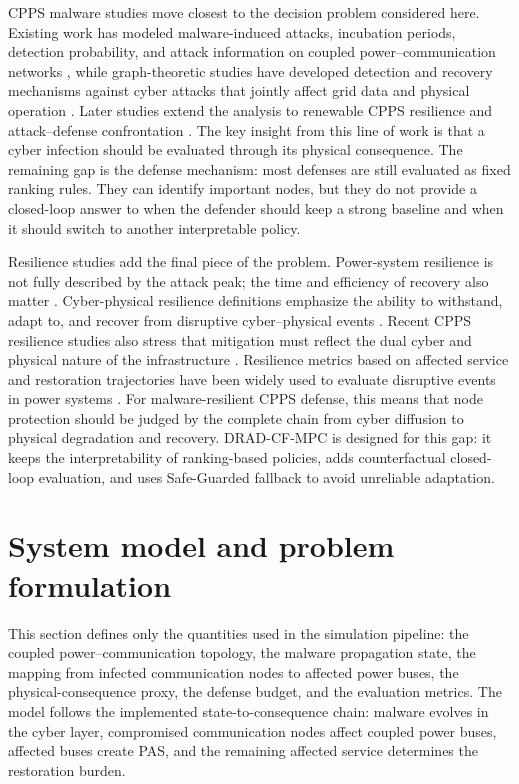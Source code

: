 \documentclass[lettersize,journal]{IEEEtran}
\begin{document}
CPPS malware studies move closest to the decision problem considered here. Existing work has modeled malware-induced attacks, incubation periods, detection probability, and attack information on coupled power--communication networks \cite{xu2020analysis}, while graph-theoretic studies have developed detection and recovery mechanisms against cyber attacks that jointly affect grid data and physical operation \cite{soltan2019react}. Later studies extend the analysis to renewable CPPS resilience and attack--defense confrontation \cite{xu2023resilience,zhang2025robustness}. The key insight from this line of work is that a cyber infection should be evaluated through its physical consequence. The remaining gap is the defense mechanism: most defenses are still evaluated as fixed ranking rules. They can identify important nodes, but they do not provide a closed-loop answer to when the defender should keep a strong baseline and when it should switch to another interpretable policy.

Resilience studies add the final piece of the problem. Power-system resilience is not fully described by the attack peak; the time and efficiency of recovery also matter \cite{mahzarnia2020review,younesi2022trends}. Cyber-physical resilience definitions emphasize the ability to withstand, adapt to, and recover from disruptive cyber--physical events \cite{arghandeh2016definition}. Recent CPPS resilience studies also stress that mitigation must reflect the dual cyber and physical nature of the infrastructure \cite{ding2024dual}. Resilience metrics based on affected service and restoration trajectories have been widely used to evaluate disruptive events in power systems \cite{panteli2015influence,panteli2017metrics}. For malware-resilient CPPS defense, this means that node protection should be judged by the complete chain from cyber diffusion to physical degradation and recovery. DRAD-CF-MPC is designed for this gap: it keeps the interpretability of ranking-based policies, adds counterfactual closed-loop evaluation, and uses Safe-Guarded fallback to avoid unreliable adaptation.

\section{System model and problem formulation}
\label{sec:system_model}

This section defines only the quantities used in the simulation pipeline: the coupled power--communication topology, the malware propagation state, the mapping from infected communication nodes to affected power buses, the physical-consequence proxy, the defense budget, and the evaluation metrics. The model follows the implemented state-to-consequence chain: malware evolves in the cyber layer, compromised communication nodes affect coupled power buses, affected buses create PAS, and the remaining affected service determines the restoration burden.
\end{document}
